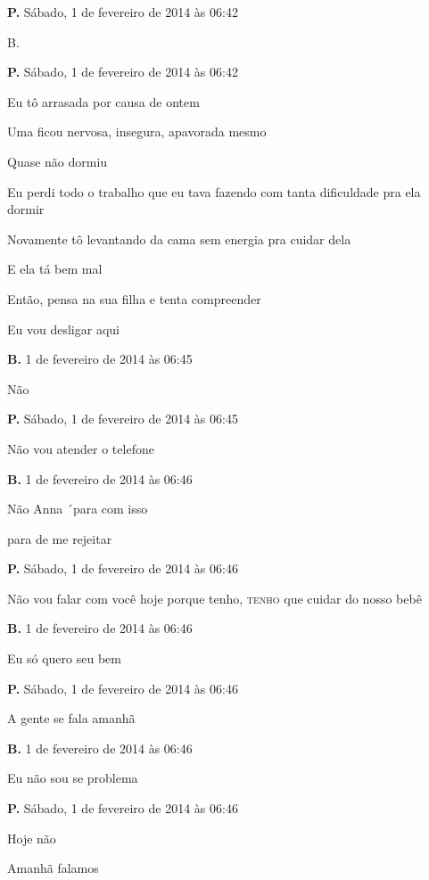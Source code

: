 {\parindent0pt\parskip1pt\raggedright
\textbf{P.} Sábado, 1 de fevereiro de 2014 às 06:42

B.

\textbf{P.} Sábado, 1 de fevereiro de 2014 às 06:42

Eu tô arrasada por causa de ontem

Uma ficou nervosa, insegura, apavorada mesmo

Quase não dormiu

Eu perdi todo o trabalho que eu tava fazendo com tanta dificuldade pra
ela dormir

Novamente tô levantando da cama sem energia pra cuidar dela

E ela tá bem mal

Então, pensa na sua filha e tenta compreender

Eu vou desligar aqui

\textbf{B.} 1 de fevereiro de 2014 às 06:45

Não

\textbf{P.} Sábado, 1 de fevereiro de 2014 às 06:45

Não vou atender o telefone

\textbf{B.} 1 de fevereiro de 2014 às 06:46

Não Anna ´para com isso

para de me rejeitar

\textbf{P.} Sábado, 1 de fevereiro de 2014 às 06:46

Não vou falar com você hoje porque tenho, \textsc{tenho} que cuidar do nosso bebê

\textbf{B.} 1 de fevereiro de 2014 às 06:46

Eu só quero seu bem

\textbf{P.} Sábado, 1 de fevereiro de 2014 às 06:46

A gente se fala amanhã

\textbf{B.} 1 de fevereiro de 2014 às 06:46

Eu não sou se problema

\textbf{P.} Sábado, 1 de fevereiro de 2014 às 06:46

Hoje não

Amanhã falamos

}
